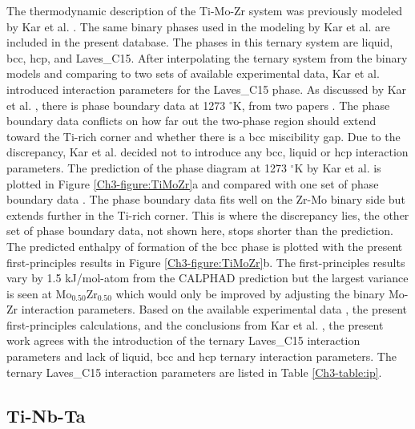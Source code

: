 The thermodynamic description of the Ti-Mo-Zr system was previously modeled by Kar et al. \cite{Kar2008}. The same binary phases used in the modeling by Kar et al. are included in the present database. The phases in this ternary system are liquid, bcc, hcp, and Laves\_C15. After interpolating the ternary system from the binary models and comparing to two sets of available experimental data, Kar et al. \cite{Kar2008} introduced interaction parameters for the Laves\_C15 phase. As discussed by Kar et al. \cite{Kar2008}, there is phase boundary data at 1273 $^{\circ}$K, from two papers \cite{Kar2008}. The phase boundary data conflicts on how far out the two-phase region should extend toward the Ti-rich corner and whether there is a bcc miscibility gap. Due to the discrepancy, Kar et al. \cite{Kar2008} decided not to introduce any bcc, liquid or hcp interaction parameters. The prediction of the phase diagram at 1273 $^{\circ}$K by Kar et al. \cite{Kar2008} is plotted in Figure \ref{Ch3-figure:TiMoZr}a and compared with one set of phase boundary data \cite{Kar2008}. The phase boundary data fits well on the Zr-Mo binary side but extends further in the Ti-rich corner. This is where the discrepancy lies, the other set of phase boundary data, not shown here, stops shorter than the prediction. The predicted enthalpy of formation of the bcc phase is plotted with the present first-principles results in Figure \ref{Ch3-figure:TiMoZr}b. The first-principles results vary by 1.5 kJ/mol-atom from the CALPHAD prediction but the largest variance is seen at Mo$_{0.50}$Zr$_{0.50}$ which would only be improved by adjusting the binary Mo-Zr interaction parameters. Based on the available experimental data \cite{Kar2008}, the present first-principles calculations, and the conclusions from Kar et al. \cite{Kar2008}, the present work agrees with the introduction of the ternary Laves\_C15 interaction parameters and lack of liquid, bcc and hcp ternary interaction parameters. The ternary Laves\_C15 interaction parameters are listed in Table \ref{Ch3-table:ip}.

\subsection{Ti-Nb-Ta}

